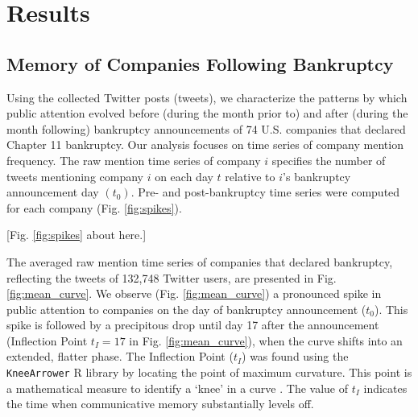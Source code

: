 \documentclass[9pt,twocolumn,twoside,lineno]{pnas-new}
\begin{document}
\section*{Results}
\label{sec:results}

\subsection*{Memory of Companies Following Bankruptcy}
Using the collected Twitter posts (tweets), we characterize the patterns by which public attention evolved before (during the month prior to) and after (during the month following) bankruptcy announcements of 74 U.S. companies that declared Chapter 11 bankruptcy.
Our analysis focuses on time series of company mention frequency. 
The raw mention time series of company $i$ specifies the number of tweets mentioning company $i$ on each day $t$ relative to $i$'s bankruptcy announcement day $(t_0)$.
Pre- and post-bankruptcy time series were computed for each company (Fig. \ref{fig:spikes}).


\centerline{[Fig. \ref{fig:spikes} about here.]}



The averaged raw mention time series of companies that declared bankruptcy, reflecting the tweets of 132,748 Twitter users, are presented in Fig. \ref{fig:mean_curve}.
We observe (Fig. \ref{fig:mean_curve}) a pronounced spike in public attention to companies on the day of bankruptcy announcement ($t_0$). 
This spike is followed by a precipitous drop until day 17 after the announcement (Inflection Point $t_I = 17$ in Fig. \ref{fig:mean_curve}), when the curve shifts into an extended, flatter phase.
The Inflection Point ($t_I$) was found using the \texttt{KneeArrower} R library by locating the point of maximum curvature.
This point is a mathematical measure to identify a `knee' in a curve  \cite{satopaa2011finding}.
The value of $t_I$ indicates the time when communicative memory substantially levels off. 
\end{document}
